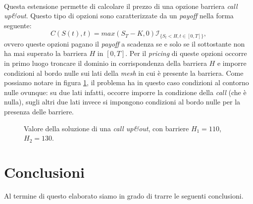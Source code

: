 \documentclass[a4paper,10pt]{report}
\theoremstyle{plain}
\theoremstyle{definition}
\theoremstyle{remark}
\begin{document}
\begin{description}[leftmargin=0cm]
 \item[\bf barrier\_extension]  \hfill \\ Questa estensione permette di calcolare il prezzo di una opzione barriera \emph{call up\&out}. Questo tipo di opzioni sono caratterizzate da un \emph{payoff} nella forma seguente: $$C(S(t),t)=max(S_T-K,0)\mathcal{I}_{\{S_t<H, t\in[0,T]\}},$$ ovvero queste opzioni pagano il \emph{payoff} a scadenza se e solo se il sottostante non ha mai superato la barriera $H$ in $[0,T]$. Per il \emph{pricing} di queste opzioni occorre in primo luogo troncare il dominio in corrispondenza della barriera $H$ e imporre condizioni al bordo nulle sui lati della \emph{mesh} in cui \`e presente la barriera. Come possiamo notare in figura \ref{fig:barrier}, il problema ha in questo caso condizioni al contorno nulle ovunque: su due lati infatti, occorre imporre la condizione della \emph{call} (che \`e nulla), sugli altri due lati invece si impongono condizioni al bordo nulle per la presenza delle barriere.
 \begin{figure}[htp!]
\begin{center}
\caption{Valore della soluzione di una \emph{call up\&out}, con barriere $H_1=110$, $H_2=130$.}
\label{fig:barrier}
\end{center}
\end{figure}
\end{description}


\chapter{Conclusioni}
Al termine di questo elaborato siamo in grado di trarre le seguenti conclusioni.\\
\end{document}
